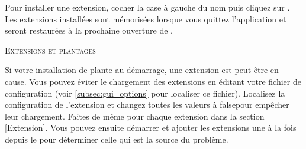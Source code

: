 Pour installer une extension, cocher la case à gauche du nom puis cliquez sur .
Les extensions installées sont mémorisées lorsque vous quittez l'application et seront restaurées à la prochaine ouverture de \qg.

\begin{Tip}\caption{\textsc{Extensions et plantages}}
Si votre installation de \qg plante au démarrage, une extension est peut-être en cause.
Vous pouvez éviter le chargement des extensions en éditant votre fichier de configuration (voir \ref{subsec:gui_options} pour localiser ce fichier).
Localisez la configuration de l'extension et changez toutes les valeurs à \og false\fg pour empêcher leur chargement.
Faites de même pour chaque extension dans la section [Extension].
Vous pouvez ensuite démarrer \qg et ajouter les extensions une à la fois depuis le  pour déterminer celle qui est la source du problème.
\end{Tip}


